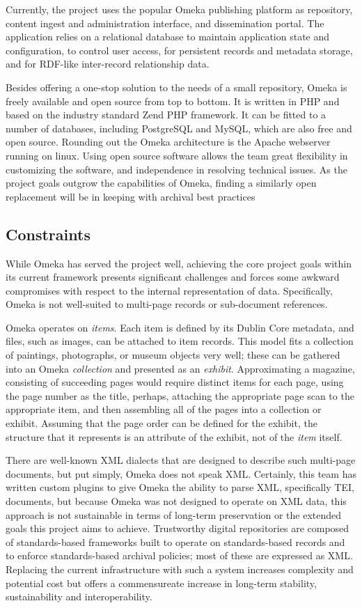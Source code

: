 Currently, the project uses the popular Omeka publishing platform as repository, content ingest and administration interface, and dissemination portal. The application relies on a relational database to maintain application state and configuration, to control user access, for persistent records and metadata storage, and for RDF-like inter-record relationship data. 

Besides offering a one-stop solution to the needs of a small repository, Omeka is freely available and open source from top to bottom. It is written in PHP and based on the industry standard Zend PHP framework. It can be fitted to a number of databases, including PostgreSQL and MySQL, which are also free and open source. Rounding out the Omeka architecture is the Apache webserver running on linux. Using open source software allows the team great flexibility in customizing the software, and independence in resolving technical issues. As the project goals outgrow the capabilities of Omeka, finding a similarly open replacement will be in keeping with archival best practices \needcite

\subsection{Constraints}
While Omeka has served the project well, achieving the core project goals within its current framework presents significant challenges and forces some awkward compromises  with respect to the internal representation of data. Specifically, Omeka is not well-suited to multi-page records or sub-document references. 

Omeka operates on \emph{items}. Each item is defined by its Dublin Core metadata, and files, such as images, can be attached to item records. This model fits a collection of paintings, photographs, or museum objects very well; these can be gathered into an Omeka \emph{collection} and presented as an \emph{exhibit}. Approximating a magazine, consisting of succeeding pages would require distinct items for each page, using the page number as the title, perhaps, attaching the appropriate page scan to the appropriate item, and then assembling all of the pages into a collection or exhibit. Assuming that the page order can be defined for the exhibit, the structure that it represents is an attribute of the exhibit, not of the \emph{item} itself. 

There are well-known XML dialects that are designed to describe such multi-page documents, but put simply, Omeka does not speak XML. Certainly, this team has written custom plugins to give Omeka the ability to parse XML, specifically TEI, documents, but because Omeka was not designed to operate on XML data, this approach is not sustainable in terms of long-term preservation or the extended goals this project aims to achieve. Trustworthy digital repositories are composed of standards-based frameworks built to operate on standards-based records and to enforce standards-based archival policies; most of these are expressed as XML. Replacing the current infrastructure with such a system increases complexity and potential cost but offers a commensureate increase in long-term stability, sustainability and interoperability. 